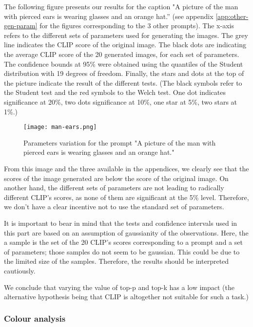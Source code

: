 \documentclass{article}
\begin{document}
\begin{multicols}{2}
The following figure presents our results for the caption "A
picture of the man with pierced ears is wearing
glasses and an orange hat.” (see appendix  \ref{app:other-gen-param} for the figures corresponding to the 3 other prompts). The x-axis refers to the different sets of parameters used for generating the images. The grey line indicates the CLIP score of the original image. The black dots are indicating the average CLIP score of the 20 generated images, for each set of parameters. The confidence bounds at 95\% were obtained using the quantiles of the Student distribution with 19 degrees of freedom. 
Finally, the stars and dots at the top of the picture indicate the result of the different tests. (The black symbols refer to the Student test and the red symbols to the Welch test. One dot indicates significance at 20\%, two dots significance at 10\%, one star at 5\%, two stars at 1\%.)

\begin{figure}[H]
    \centering
    \texttt{[image: man-ears.png]} %
    \caption{Parameters variation for the prompt "A picture of the man with pierced ears is wearing glasses and an orange hat."}
    \label{fig:gen-man-ears}
\end{figure}

From this image and the three available in the appendices, we clearly see that the scores of the image generated are below the score of the original image. On another hand, the different sets of parameters are not leading to radically different CLIP's scores, as none of them are significant at the 5\% level. Therefore, we don't have a clear incentive not to use the standard set of parameters.  

It is important to bear in mind that the tests and confidence intervals used in this part are based on an assumption of gaussianity of the observations. Here, the a sample is the set of the 20 CLIP's scores corresponding to a prompt and a set of parameters; those samples do not seem to be gaussian. This could be due to the limited size of the samples. Therefore, the results should be interpreted cautiously. 

We conclude that varying the value of top-p and top-k has a low impact (the alternative hypothesis being that CLIP is altogether not suitable for such a task.)

\subsubsection{Colour analysis}


\end{multicols}
\end{document}
